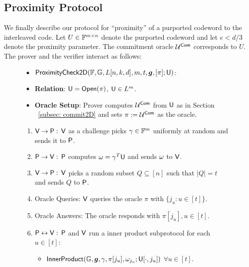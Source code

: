 \subsection{Proximity Protocol}\label{subsec:proximity2D}
We finally describe our protocol for ``proximity'' of a purported codeword to the interleaved code. Let $U\in \mathbb{F}^{m\times n}$ denote the purported codeword and let $e< d/3$ denote the proximity parameter. The commitment oracle $\mathcal{U}^{\mathsf{Com}}$ corresponds to $U$.
The prover and the verifier interact as follows:
	\begin{figure}[h!]
		\centering
		\begin{framed}
			\begin{itemize}
				\item {$\mathsf{ProximityCheck2D}(\mathbb{F}, \mathbb{G}, L[n,k,d], m, t, \bm{g}, [\pi]; \mathsf{U})$}:
				\item {\bf Relation}: $\mathsf{U} = \mathsf{Open}(\pi)$, $\mathsf{U} \in L^m$.
				\item {\bf Oracle Setup}: Prover computes $\mathcal{U}^{\mathsf{Com}}$ from $\mathsf{U}$ as in Section ~\ref{subsec: commit2D} and sets $\pi := \mathcal{U}^{\mathsf{Com}}$ as the oracle.
			\end{itemize}
			\begin{enumerate}
			\item $\mathsf{V} \rightarrow \mathsf{P} :$ $\mathsf{V}$ as a challenge picks $\gamma \in \mathbb{F}^m$ uniformly at random and sends it to $\mathsf{P}$.
	
			\item $\mathsf{P} \rightarrow \mathsf{V} :$ $\mathsf{P}$ computes $\omega=\gamma^T\mathsf{U}$ and sends $\omega$ to $\mathsf{V}$.
	
			\item $\mathsf{V} \rightarrow \mathsf{P} :$ $\mathsf{V}$ picks a random subset $Q\subseteq [n]$ such that $|Q|=t$ and sends $Q$ to $\mathsf{P}$.
	
			\item Oracle Queries: $\mathsf{V}$ queries the oracle $\pi$ with $\{j_u:u\in[t]\}$.
			
			\item Oracle Answers: The oracle responds with $\pi[j_u], u\in[t]$.
			
			\item $\mathsf{P} \leftrightarrow \mathsf{V}: $ $\mathsf{P}$ and $\mathsf{V}$ run a inner product subprotocol for each $u\in[t]$:
			\begin{itemize}
				\item $\mathsf{InnerProduct}(\mathbb{G}, \bm{g}, \gamma, \pi[j_u], \omega_{j_u}; \mathsf{U}[\cdot,j_u])$ $\forall u\in [t]$.
			\end{itemize}
	

\end{enumerate}
\end{framed}
\end{figure}
